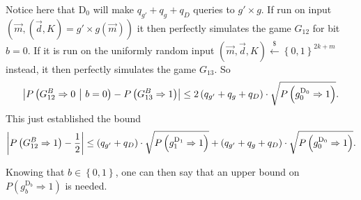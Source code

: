 Notice here that $\mathrm{D}_0$ will make $q_{g'} + q_g + q_D$ queries to $g' \times g$. If run on input $\left( \vec{m}, \left(\vec{d}, K\right) = g' \times g\left(\vec{m}\right) \right)$ it then perfectly simulates the game $G_{12}$ for bit $b=0$. If it is run on the uniformly random input $\left(\vec{m}, \vec{d}, K\right) \xleftarrow{\$} \left\{ 0,1 \right\}^{2k + m}$ instead, it then perfectly simulates the game $G_{13}$. So
\[
	\abs{P\left( G_{12}^B \Rightarrow 0 \ \middle\vert \ b = 0 \right) - P\left( G_{13}^B \Rightarrow 1 \right)} \leq 2 \left( q_{g'} + q_g + q_D \right) \cdot \sqrt{P\left( g_0^{\mathrm{D}_0} \Rightarrow 1 \right)}.
\]
This just established the bound
\[
	\left\vert P\left( G_{12}^B \Rightarrow 1 \right) - \frac{1}{2} \right\vert \leq \left( q_{g'} + q_D \right) \cdot \sqrt{P\left( g_1^{\mathrm{D}_1} \Rightarrow 1 \right)} + \left( q_{g'} + q_g + q_D \right) \cdot \sqrt{P\left( g_0^{\mathrm{D}_0} \Rightarrow 1 \right)}.
\]

Knowing that $b \in \left\{ 0,1 \right\}$, one can then say that an upper bound on $P\left( g_b^{\mathrm{D}_b} \Rightarrow 1 \right)$ is needed.

